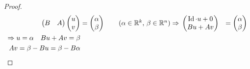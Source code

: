 \begin{satz}
\begin{proof}
\begin{align*}
\begin{pmatrix}
                B   & A
            \end{pmatrix}\begin{pmatrix}
                             u\\ v
            \end{pmatrix} &= \begin{pmatrix}
                                 \alpha\\\beta
            \end{pmatrix}\tag{$\alpha\in\R^k$, $\beta\in\R^n$}
            \impl \begin{pmatrix}
                      \Id\cdot u + 0\\ Bu + Av
            \end{pmatrix} &= \begin{pmatrix}
                                 \alpha\\\beta
            \end{pmatrix}\\
            \impl u=\alpha\quad Bu + Av = \beta\\
            Av = \beta - Bu = \beta - B\alpha\\
        \end{align*}
    \end{proof}
\end{satz}

